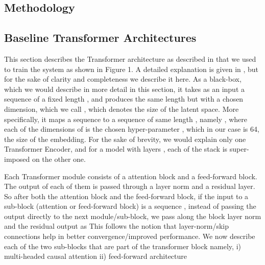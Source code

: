 \documentclass{article}
\begin{document}
\begin{sloppy}
\section{Methodology}
\label{sec:method}

\subsection{Baseline Transformer Architectures}
This section describes the Transformer architecture as described in \cite{vaswani2017attention} that we used to train the system as shown in Figure 1. A detailed explanation is given in \cite{opennmt}, but for the sake of clarity and completeness we describe it here. As a black-box, which we would describe in more detail in this section, it takes as an input a sequence of a fixed length , and produces the same length but with a chosen dimension, which we call , which denotes the size of the latent space. More specifically,  it maps a sequence  to a sequence of same length ,  namely  , where each of the dimensions of   is the chosen hyper-parameter , which in our case is 64, the size of the embedding. For the sake of brevity, we would explain only one Transformer Encoder, and for a model with layers , each of the stack is super-imposed on the other one. 


Each Transformer module consists of a attention block and a feed-forward block. The output of each of them is passed through a layer norm and a residual layer. So after both the attention block and the feed-forward block, if the input to a sub-block (attention or feed-forward block) is a sequence , instead of passing the output directly  to the next module/sub-block, we pass along the block layer norm and the residual output  as 
This follows the notion that layer-norm/skip connections help in better convergence/improved performance. We now describe each of the two sub-blocks that are part of the transformer block namely, i) multi-headed causal attention ii) feed-forward architecture


\end{sloppy}
\end{document}
